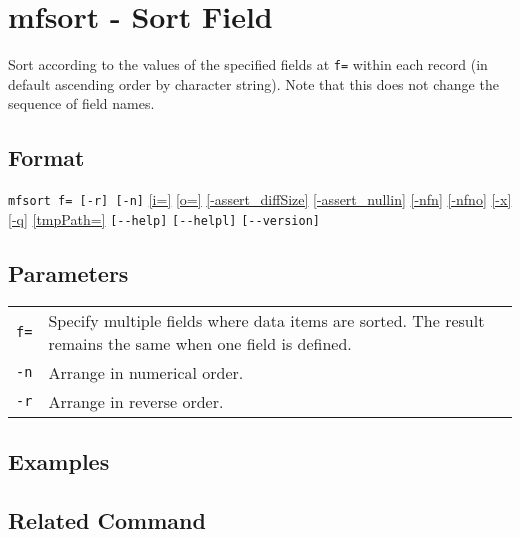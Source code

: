 
%

\section{mfsort - Sort Field\label{sect:mfsort}}
Sort according to the values of the specified fields at \verb|f=| within each record (in default ascending order by character string). Note that this does not change the sequence of field names. 

\subsection*{Format}
\verb|mfsort f= [-r] [-n]| 
\hyperref[sect:option_i]{[i=]}
\hyperref[sect:option_o]{[o=]}
\hyperref[sect:option_assert_diffSize]{[-assert\_diffSize]}
\hyperref[sect:option_assert_nullin]{[-assert\_nullin]}
\hyperref[sect:option_nfn]{[-nfn]} 
\hyperref[sect:option_nfno]{[-nfno]}  
\hyperref[sect:option_x]{[-x]}
\hyperref[sect:option_q]{[-q]}
\hyperref[sect:option_option_tmppath]{[tmpPath=]}
\verb|[--help]|
\verb|[--helpl]|
\verb|[--version]|\\

\subsection*{Parameters}
\begin{table}[htbp]
{\small
\begin{tabular}{ll}
\verb|f=| & Specify multiple fields where data items are sorted. The result remains the same when one field is defined. \\
\verb|-n| & Arrange in numerical order. \\
\verb|-r| & Arrange in reverse order. \\
\end{tabular} 
}
\end{table} 

\subsection*{Examples}


\subsection*{Related Command}

%

